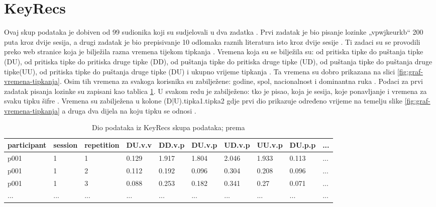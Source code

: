\documentclass[]{foi}
\begin{document}
\section{KeyRecs}
Ovaj skup podataka je dobiven od 99 sudionika koji su sudjelovali u dva zadatka  \cite{Dias2023}. Prvi zadatak je bio pisanje lozinke „vpwjkeurkb“ 200 puta kroz dvije sesija, a drugi zadatak je bio prepisivanje 10 odlomaka raznih literatura isto kroz dvije sesije \cite{Dias2023}. Ti zadaci su se provodili preko web stranice koja je bilježila razna vremena tijekom tipkanja \cite{Dias2023}. Vremena koja su se bilježila su: od pritiska tipke do puštanja tipke (DU), od pritiska tipke do pritiska druge tipke (DD), od puštanja tipke do pritiska druge tipke (UD), od puštanja tipke do puštanja druge tipke(UU), od pritiska tipke do puštanja druge tipke (DU) i ukupno vrijeme tipkanja \cite{Dias2023}. Ta vremena su dobro prikazana na slici \ref{fig:graf-vremena-tipkanja}. Osim tih vremena za svakoga korisnika su  zabilježene: godine, spol, nacionalnost i dominantna ruka  \cite{Dias2023}. Podaci za prvi zadatak pisanja lozinke su zapisani kao tablica \ref{tab:KeyRecs-podaci}. U svakom redu je zabilježeno: tko je pisao, koja je sesija, koje ponavljanje i vremena za svaku tipku šifre \cite{Dias2023}. Vremena su zabilježena u kolone (D|U).tipka1.tipka2 gdje prvi dio prikazuje određeno vrijeme na temelju slike \ref{fig:graf-vremena-tipkanja} a druga dva dijela na koju tipku se odnosi \cite{Dias2023}.

\begin{table}[!h]
    \centering
    \caption{Dio podataka iz KeyRecs skupa podataka; prema \cite{Dias2023}}
    \begin{tabularx}{1\textwidth}{|l|l|l|l|l|l|l|l|l|l|}
    \hline
        \cellcolor{gray!25}participant & \cellcolor{gray!25}session & \cellcolor{gray!25}repetition & \cellcolor{gray!25}DU.v.v & \cellcolor{gray!25}DD.v.p & \cellcolor{gray!25}DU.v.p & \cellcolor{gray!25}UD.v.p & \cellcolor{gray!25}UU.v.p & \cellcolor{gray!25}DU.p.p & \cellcolor{gray!25}... \\ \hline
        p001 & 1 & 1 & 0.129 & 1.917 & 1.804 & 2.046 & 1.933 & 0.113 & ... \\ \hline
        p001 & 1 & 2 & 0.112 & 0.192 & 0.096 & 0.304 & 0.208 & 0.096 & ... \\ \hline
        p001 & 1 & 3 & 0.088 & 0.253 & 0.182 & 0.341 & 0.27 & 0.071 & ... \\ \hline
        ... & ... & ... & ... & ... & ... & ... & ... & ... & ... \\ \hline
    \end{tabularx}
    \\[10pt]
    \label{tab:KeyRecs-podaci}
\end{table}
\end{document}
